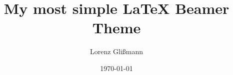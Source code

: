 \documentclass{beamer}
\author{Lorenz Glißmann}
\title{My most simple \LaTeX{} Beamer Theme}
\institute{Universität Göttingen}
\date{\today}
\begin{document}
\setcounter{page}{0}
\begin{frame}[t,plain]
\titlepage
\end{frame}




\end{document}

